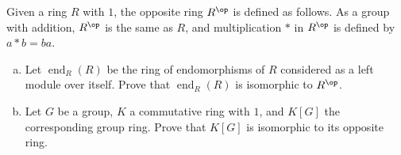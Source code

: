 \documentclass[10pt]{mypackage}
\begin{document}
\RaggedRight
\begin{problem}[Problem 1]
  Given a ring $R$ with $1$, the opposite ring $R^{\op}$ is defined as follows. As a group with addition, $R^{\op}$ is the same as $R$, and multiplication $\ast$ in $R^{\op}$ is defined by $a\ast b = ba$.
  \begin{enumerate}[(a)]
    \item Let $\operatorname{end}_R(R)$ be the ring of endomorphisms of $R$ considered as a left module over itself. Prove that $\operatorname{end}_R(R)$ is isomorphic to $R^{\op}$.
    \item Let $G$ be a group, $K$ a commutative ring with $1$, and $K[G]$ the corresponding group ring. Prove that $K[G]$ is isomorphic to its opposite ring.
  \end{enumerate}
\end{problem}
\end{document}
